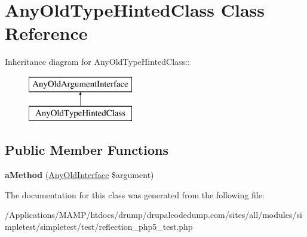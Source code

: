 \hypertarget{class_any_old_type_hinted_class}{
\section{AnyOldTypeHintedClass Class Reference}
\label{class_any_old_type_hinted_class}
}
Inheritance diagram for AnyOldTypeHintedClass::\begin{figure}[H]
\begin{center}
\leavevmode
\includegraphics[height=2cm]{class_any_old_type_hinted_class}
\end{center}
\end{figure}
\subsection*{Public Member Functions}
\begin{DoxyCompactItemize}
\item 
\hypertarget{class_any_old_type_hinted_class_a45db2245a2f2b0e6979af3734b5dd79a}{
{\bfseries aMethod} (\hyperlink{interface_any_old_interface}{AnyOldInterface} \$argument)}
\label{class_any_old_type_hinted_class_a45db2245a2f2b0e6979af3734b5dd79a}

\end{DoxyCompactItemize}


The documentation for this class was generated from the following file:\begin{DoxyCompactItemize}
\item 
/Applications/MAMP/htdocs/drump/drupalcodedump.com/sites/all/modules/simpletest/simpletest/test/reflection\_\-php5\_\-test.php\end{DoxyCompactItemize}
